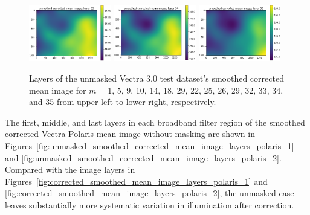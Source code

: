 \documentclass[letterpaper,11pt]{article}
\begin{document}
\begin{figure}[!ht]
\includegraphics[width=0.32\textwidth]{images/results/unmasked_smoothed_corrected_mean_image_layers_vectra/unmasked_smoothed_corrected_mean_image_layer_33}
\includegraphics[width=0.32\textwidth]{images/results/unmasked_smoothed_corrected_mean_image_layers_vectra/unmasked_smoothed_corrected_mean_image_layer_34}
\includegraphics[width=0.32\textwidth]{images/results/unmasked_smoothed_corrected_mean_image_layers_vectra/unmasked_smoothed_corrected_mean_image_layer_35}
\caption{\footnotesize Layers of the unmasked Vectra 3.0 test dataset's smoothed corrected mean image for $m=$1, 5, 9, 10, 14, 18, 29, 22, 25, 26, 29, 32, 33, 34, and 35 from upper left to lower right, respectively.}
\label{fig:unmasked_smoothed_corrected_mean_image_layers_vectra}
\end{figure}

The first, middle, and last layers in each broadband filter region of the smoothed corrected Vectra Polaris mean image without masking are shown in Figures~\ref{fig:unmasked_smoothed_corrected_mean_image_layers_polaris_1} and \ref{fig:unmasked_smoothed_corrected_mean_image_layers_polaris_2}. Compared with the image layers in Figures~\ref{fig:corrected_smoothed_mean_image_layers_polaris_1} and \ref{fig:corrected_smoothed_mean_image_layers_polaris_2}, the unmasked case leaves substantially more systematic variation in illumination after correction.
\end{document}
